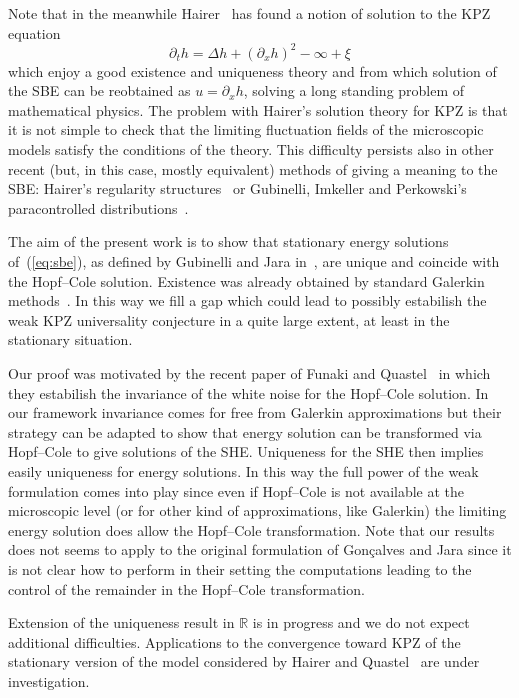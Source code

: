 \documentclass[a4paper,11pt]{article}
\begin{document}
Note that in the meanwhile Hairer~{\cite{hairer_solving_2011}} has found a
notion of solution to the KPZ equation
\begin{equation}
  \partial_t h = \Delta h + (\partial_x h)^2 - \infty + \xi \label{eq:kpz}
\end{equation}
which enjoy a good existence and uniqueness theory and from which solution of
the SBE can be reobtained as $u = \partial_x h$, solving a long standing
problem of mathematical physics. The problem with Hairer's solution theory for
KPZ is that it is not simple to check that the limiting fluctuation fields of
the microscopic models satisfy the conditions of the theory. This difficulty
persists also in other recent (but, in this case, mostly equivalent) methods
of giving a meaning to the SBE: Hairer's regularity
structures~{\cite{Hairer2014Regularity}} or Gubinelli, Imkeller and
Perkowski's paracontrolled
distributions~{\cite{gubinelli_paracontrolled_2015,gubinelli_lectures_2015}}.

The aim of the present work is to show that stationary energy solutions
of~(\ref{eq:sbe}), as defined by Gubinelli and Jara
in~{\cite{gubinelli_regularization_2013}}, are unique and coincide with the
Hopf--Cole solution. Existence was already obtained by standard Galerkin
methods~{\cite{gubinelli_regularization_2013}}. In this way we fill a gap
which could lead to possibly estabilish the weak KPZ universality conjecture
in a quite large extent, at least in the stationary situation.

Our proof was motivated by the recent paper of Funaki and
Quastel~{\cite{funaki_kpz_2014}} in which they estabilish the invariance of
the white noise for the Hopf--Cole solution. In our framework invariance comes
for free from Galerkin approximations but their strategy can be adapted to
show that energy solution can be transformed via Hopf--Cole to give solutions
of the SHE. Uniqueness for the SHE then implies easily uniqueness for energy
solutions. In this way the full power of the weak formulation comes into play
since even if Hopf--Cole is not available at the microscopic level (or for
other kind of approximations, like Galerkin) the limiting energy solution does
allow the Hopf--Cole transformation. Note that our results does not seems to
apply to the original formulation of Gon{\c c}alves and Jara since it is not
clear how to perform in their setting the computations leading to the control
of the remainder in the Hopf--Cole transformation.

Extension of the uniqueness result in $\mathbb{R}$ is in progress and we do
not expect additional difficulties. Applications to the convergence toward KPZ
of the stationary version of the model considered by Hairer and
Quastel~{\cite{hairer-quastel}} are under investigation. \ \ \
\end{document}
